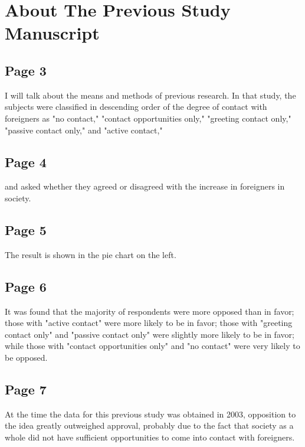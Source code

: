 \documentclass[10pt]{jarticle}
\title{\framebox{\hspace{4zw}English 2B Presentation Manuscript%
                 \hspace{4zw}}}
\author{Tomoya Shinno \\
        2022311042  \\
        Aichi Prefectural University Faculty of Information Science\\}
\date{12/24/2023}
\begin{document}
\maketitle

\section{About The Previous Study Manuscript}
\subsection{Page 3}
%
I will talk about the means and methods of previous research. 
In that study, the subjects were classified in descending order of 
the degree of contact with foreigners as "no contact," "contact 
opportunities only," "greeting contact only," "passive contact only," 
and "active contact," 
\subsection{Page 4}
and asked whether they agreed or disagreed with 
the increase in foreigners in society.
\subsection{Page 5}
The result is shown in the pie chart on the left.
\subsection{Page 6}
It was found that the majority of respondents were more opposed 
than in favor; those with "active contact" were more likely to be in favor; 
those with "greeting contact only" and "passive contact only" were slightly 
more likely to be in favor; while those with "contact opportunities only" 
and "no contact" were very likely to be opposed.
\subsection{Page 7}
At the time the data for this previous study was obtained in 2003, 
opposition to the idea greatly outweighed approval, 
probably due to the fact that society as a whole did not 
have sufficient opportunities to come into contact with foreigners.
%
\end{document}
